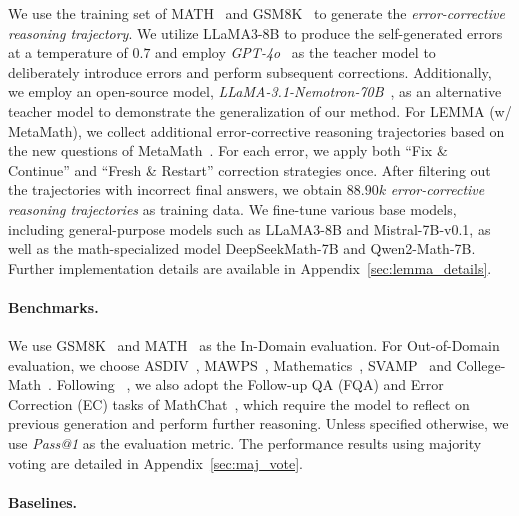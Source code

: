 \documentclass[11pt]{article}
\begin{document}
We use the training set of MATH~\cite{hendrycksmath2021} and GSM8K~\cite{cobbe2021training} to generate the \textit{error-corrective reasoning trajectory}. We utilize LLaMA3-8B to produce the self-generated errors at a temperature of $0.7$ and employ \textit{GPT-4o}~\cite{hurst2024gpt} as the teacher model to deliberately introduce errors and perform subsequent corrections. Additionally, we employ an open-source model, \textit{LLaMA-3.1-Nemotron-70B}~\cite{wang2024helpsteer2}, as an alternative teacher model to demonstrate the generalization of our method. For LEMMA (w/ MetaMath), we collect additional error-corrective reasoning trajectories based on the new questions of MetaMath~\citep{yumetamath}. For each error, we apply both ``Fix \& Continue'' and ``Fresh \& Restart'' correction strategies once. After filtering out the trajectories with incorrect final answers, we obtain $88.90k$ \textit{error-corrective reasoning trajectories} as training data. 
We fine-tune various base models, including general-purpose models such as LLaMA3-8B and Mistral-7B-v0.1, as well as the math-specialized model DeepSeekMath-7B and Qwen2-Math-7B. Further implementation details are available in Appendix~\ref{sec:lemma_details}.

\paragraph{Benchmarks.}
We use GSM8K~\cite{cobbe2021training} and MATH~\cite{hendrycksmath2021} as the In-Domain evaluation. For Out-of-Domain evaluation, we choose ASDIV~\cite{miao-etal-2020-diverse}, MAWPS~\cite{koncel2016mawps}, Mathematics~\cite{davies2021advancing}, SVAMP~\cite{patel2021nlp} and College-Math~\cite{tangmathscale}. Following ~\citet{zhang-etal-2024-learn}, we also adopt the Follow-up QA (FQA) and Error Correction (EC) tasks of MathChat~\cite{liang2024mathchat}, which require the model to reflect on previous generation and perform further reasoning. Unless specified otherwise, we use \textit{Pass@1} as the evaluation metric. The performance results using majority voting are detailed in Appendix~\ref{sec:maj_vote}.



\paragraph{Baselines.}
\end{document}
